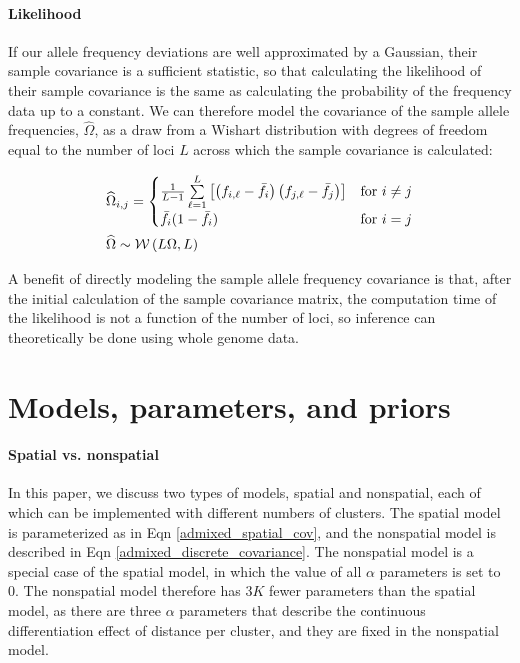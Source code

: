 \documentclass[12pt]{article}
\begin{document}
\paragraph{Likelihood}
If our allele frequency deviations are well approximated by a Gaussian, 
their sample covariance is a sufficient statistic,
so that calculating the likelihood of their sample covariance is the same as 
calculating the probability of the frequency data up to a constant. 
We can therefore model the covariance of the sample allele frequencies, $\widehat{\Omega}$, 
as a draw from a Wishart distribution with degrees of freedom equal to 
the number of loci $L$ across which the sample covariance is calculated:

\begin{align}
&\widehat{\Omega}_{i,j} = 
	\begin{cases}
		\frac{1}{L-1}
		\sum\limits_{\ell=1}^{L}{\left[ 	\left(f_{i,\ell} - \bar{f}_{i} \right)
		 	\left(f_{j,\ell} - \bar{f}_{j} \right)\right] \notag
			} & \text{for } i \neq j \\
		\bar{f}_i (1-\bar{f}_i) & \text{for } i = j \\
	\end{cases}\\
&\widehat{\Omega} \sim \mathcal{W}\left( L\Omega, L	\right)
\label{wishart}
\end{align}

A benefit of directly modeling the sample allele frequency covariance is that, 
after the initial calculation of the sample covariance matrix,
the computation time of the likelihood is not a function of the number of loci,
so inference can theoretically be done using whole genome data.

\section{Models, parameters, and priors}\label{model_app}
\paragraph{Spatial vs. nonspatial}
In this paper, we discuss two types of models, spatial and nonspatial, 
each of which can be implemented with different numbers of clusters.
The spatial model is parameterized as in Eqn \ref{admixed_spatial_cov},
and the nonspatial model is described in Eqn \ref{admixed_discrete_covariance}.
The nonspatial model is a special case of the spatial model, 
in which the value of all $\alpha$ parameters is set to 0.
The nonspatial model therefore has $3K$ fewer parameters than the spatial model,
as there are three $\alpha$ parameters that describe the continuous differentiation effect of distance per cluster,
and they are fixed in the nonspatial model.
\end{document}
